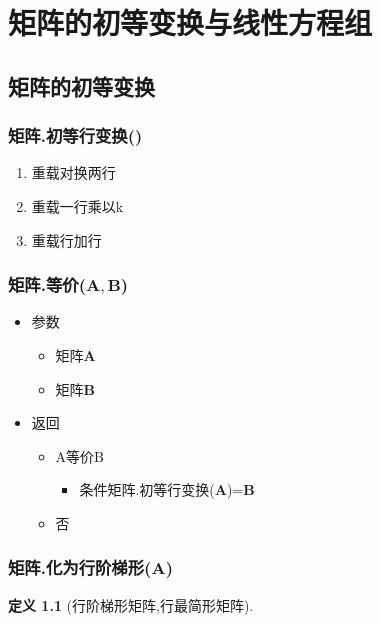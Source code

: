 \documentclass[UTF8,a4paper,12pt,scheme=chinese]{ctexbook}
\newtheorem{definition}{定义}[section]
\begin{document}
	\chapter{矩阵的初等变换与线性方程组}
	\section{矩阵的初等变换}
	\subsection{矩阵.初等行变换()}
%		
	\begin{enumerate}
		\item 重载\quad 对换两行
		\item 重载\quad 一行乘以k
		\item 重载\quad 行加行
	\end{enumerate}
	\subsection{矩阵.等价($ \boldsymbol{A},\boldsymbol{B} $)}
	\begin{itemize}
		\item 参数
		\begin{itemize}
			\item 矩阵$ \boldsymbol{A} $
			\item 矩阵$ \boldsymbol{B} $
		\end{itemize}
		\item 返回
		\begin{itemize}
			\item A等价B
			\begin{itemize}
				\item 条件\quad 矩阵.初等行变换($ \boldsymbol{A} $)=$ \boldsymbol{B} $
			\end{itemize}
			\item 否
		\end{itemize}
	\end{itemize}
	\subsection{矩阵.化为行阶梯形($ \boldsymbol{A} $)}
	\begin{definition}[行阶梯形矩阵,行最简形矩阵]
		
	\end{definition}
\end{document}
